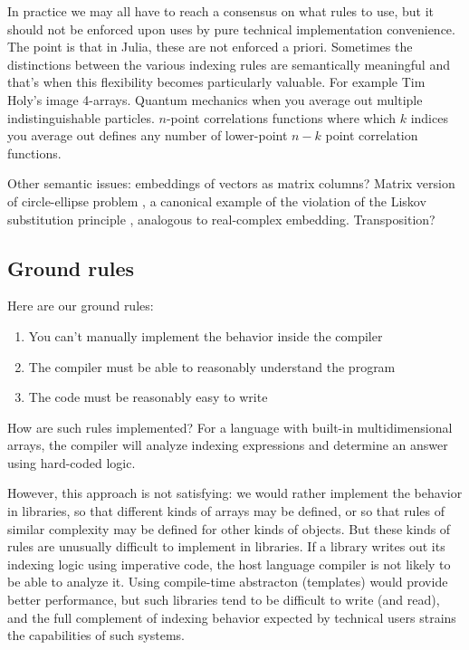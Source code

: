 \documentclass[preprint]{sigplanconf}
\begin{document}
In practice we may all have to reach a consensus on what rules to use, but it
should not be enforced upon uses by pure technical implementation convenience.
The point is that in Julia, these are not enforced a priori. Sometimes the
distinctions between the various indexing rules are semantically meaningful
and that's when this flexibility becomes particularly valuable. For example
Tim Holy's image 4-arrays. Quantum mechanics when you average out multiple
indistinguishable particles. $n$-point correlations functions where which $k$
indices you average out defines any number of lower-point $n-k$ point
correlation functions.

Other semantic issues: embeddings of vectors as matrix columns? Matrix version
of circle-ellipse problem \cite{Halbert:1987ut}, a canonical example of the
violation of the Liskov substitution principle \cite{Liskov:1987da}, analogous
to real-complex embedding. Transposition?

\subsection{Ground rules}
Here are our ground rules:

\begin{enumerate}
\item You can't manually implement the behavior inside the compiler
\item The compiler must be able to reasonably understand the program
\item The code must be reasonably easy to write
\end{enumerate}

How are such rules implemented? For a language with built-in multidimensional
arrays, the compiler will analyze indexing expressions and determine an answer
using hard-coded logic.


However, this approach is not satisfying: we would rather implement the
behavior in libraries, so that different kinds of arrays may be defined, or so
that rules of similar complexity may be defined for other kinds of objects.
But these kinds of rules are unusually difficult to implement in libraries. If
a library writes out its indexing logic using imperative code, the host
language compiler is not likely to be able to analyze it. Using compile-time
abstracton (templates) would provide better performance, but such libraries
tend to be difficult to write (and read), and the full complement of indexing
behavior expected by technical users strains the capabilities of such systems.
\end{document}
